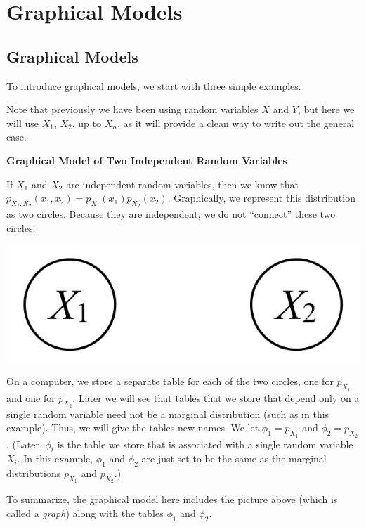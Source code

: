 \documentclass[6008notes.tex]{subfiles}
\begin{document}
\graphicspath{ {images/graphmod/} }

\section{Graphical Models}

\subsection{Graphical Models}

To introduce graphical models, we start with three simple examples.

Note that previously we have been using random variables $X$ and $Y$, but here we will use $X_1$, $X_2$, up to $X_n$, as it will provide a clean way to write out the general case.

\textbf{Graphical Model of Two Independent Random Variables}

If $X_1$ and $X_2$ are independent random variables, then we know that $p_{X_1,X_2}(x_1,x_2)=p_{X_1}(x_1)p_{X_2}(x_2)$. Graphically, we represent this distribution as two circles. Because they are independent, we do not ``connect'' these two circles:

{\centering\includegraphics[scale=0.4]{images_sec-graphical-models-2-rv-indep} \par}

On a computer, we store a separate table for each of the two circles, one for $p_{X_1}$ and one for $p_{X_2}$. Later we will see that tables that we store that depend only on a single random variable need not be a marginal distribution (such as in this example). Thus, we will give the tables new names. We let $\phi_1 = p_{X_1}$ and $\phi_2 = p_{X_2}$. (Later, $\phi_i$ is the table we store that is associated with a single random variable $X_i$. In this example, $\phi_1$ and $\phi_2$ are just set to be the same as the marginal distributions $p_{X_1}$ and $p_{X_2}$.)

To summarize, the graphical model here includes the picture above (which is called a \textit{graph}) along with the tables $\phi_1$ and $\phi_2$.
\end{document}
